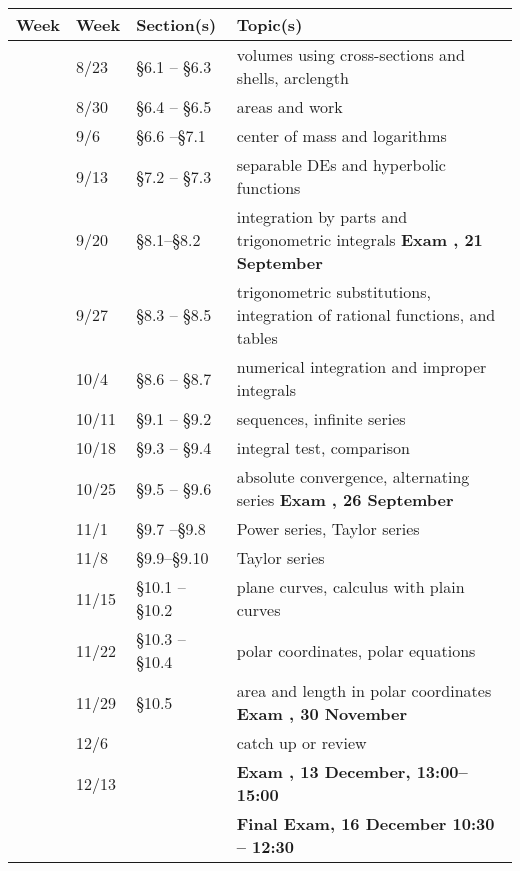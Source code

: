 \documentclass[12pt,fullpage]{article}
\newcounter{ex}\setcounter{ex}{0}
\newcommand{\ex}{%
\setcounter{ex}{\value{ex}+1}
Exam \theex}
\newcounter{wk}\setcounter{wk}{0}
\newcommand{\wk}{%
\setcounter{wk}{\value{wk}+1}
\thewk \,\,}
\begin{document}
\begin{center}

\begin{tabular}  {|l|l|l|l|}
\hline
{\bf Week}  & {\bf Week} &  {\bf Section(s)} & {\bf Topic(s)} \\
\hline \hline 
\wk    & 8/23 &    \S6.1 -- \S6.3   & volumes using cross-sections and shells, arclength \\
\wk    & 8/30  &  \S6.4 -- \S6.5   &  areas and work \\
\wk    & 9/6 &     \S6.6 --\S7.1  &  center of mass and logarithms  \\
\wk    & 9/13  &     \S7.2 -- \S7.3  & separable DEs   and hyperbolic functions                     \\
\wk    & 9/20 &  \S8.1--\S8.2    &  integration by parts and trigonometric integrals    \hfill \textbf{\ex\-\-, 21 September}  \\
\wk    & 9/27   & \S8.3 -- \S8.5   & trigonometric substitutions, integration of rational functions, and tables   \\
\wk    & 10/4     & \S8.6 -- \S8.7  & numerical integration and improper integrals  \\
\wk   & 10/11   & \S9.1 -- \S9.2  &   sequences, infinite series\\
\wk  &  10/18   & \S9.3 -- \S9.4 &  integral test, comparison \\ 
\wk &  10/25     &   \S9.5 -- \S9.6 &  absolute convergence, alternating series \hfill  \textbf{ \ex, 26 September}  \\
\wk  & 11/1  &   \S9.7 --\S9.8 & Power series, Taylor series \\
\wk   & 11/8  & \S9.9--\S9.10  &  Taylor series \\
\wk   & 11/15& \S10.1  -- \S10.2   & plane curves, calculus with plain curves   \\
\wk   & 11/22   &  \S10.3 -- \S10.4   & polar coordinates, polar equations \\
\wk   & 11/29    &  \S10.5     &  area and length in polar coordinates  \hfill \textbf{ \ex, 30 November }  \\ 
\wk   & 12/6      &         &  catch up or review \\  
\wk   & 12/13      &  &     \textbf{\ex,  13 December, 13:00--15:00} \\ 
         &               & &    \textbf{ Final Exam, 16 December  10:30 -- 12:30} \\ \hline
\end{tabular}
\end{center}
\end{document}
